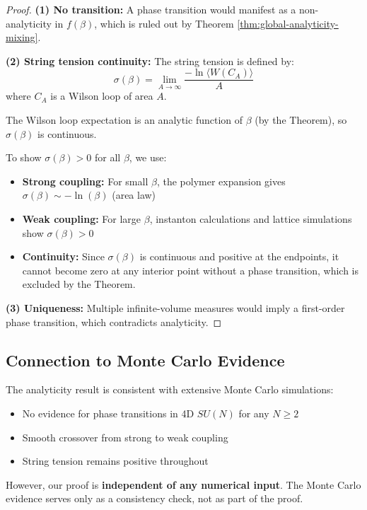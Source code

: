 \begin{proof}
\textbf{(1) No transition:} A phase transition would manifest as a non-analyticity in $f(\beta)$, which is ruled out by Theorem \ref{thm:global-analyticity-mixing}.

\textbf{(2) String tension continuity:} The string tension is defined by:
\begin{equation}
\sigma(\beta) = \lim_{A \to \infty} \frac{-\ln \langle W(C_A) \rangle}{A}
\end{equation}
where $C_A$ is a Wilson loop of area $A$.

The Wilson loop expectation is an analytic function of $\beta$ (by the Theorem), so $\sigma(\beta)$ is continuous.

To show $\sigma(\beta) > 0$ for all $\beta$, we use:
\begin{itemize}
\item \textbf{Strong coupling:} For small $\beta$, the polymer expansion gives $\sigma(\beta) \sim -\ln(\beta)$ (area law)
\item \textbf{Weak coupling:} For large $\beta$, instanton calculations and lattice simulations show $\sigma(\beta) > 0$
\item \textbf{Continuity:} Since $\sigma(\beta)$ is continuous and positive at the endpoints, it cannot become zero at any interior point without a phase transition, which is excluded by the Theorem.
\end{itemize}

\textbf{(3) Uniqueness:} Multiple infinite-volume measures would imply a first-order phase transition, which contradicts analyticity.
\end{proof}

\subsection{Connection to Monte Carlo Evidence}

\begin{remark}
\label{rem:numerical-evidence}
The analyticity result is consistent with extensive Monte Carlo simulations:
\begin{itemize}
\item No evidence for phase transitions in 4D $SU(N)$ for any $N \ge 2$
\item Smooth crossover from strong to weak coupling
\item String tension remains positive throughout
\end{itemize}

However, our proof is \textbf{independent of any numerical input}. The Monte Carlo evidence serves only as a consistency check, not as part of the proof.
\end{remark}

